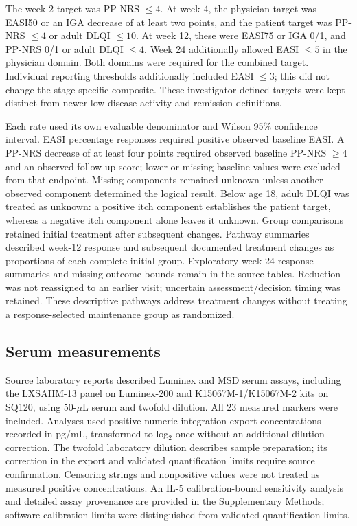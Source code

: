 The week-2 target was PP-NRS $\leq4$. At week 4, the physician target was EASI50 or an IGA decrease of at least two points, and the patient target was PP-NRS $\leq4$ or adult DLQI $\leq10$. At week 12, these were EASI75 or IGA 0/1, and PP-NRS 0/1 or adult DLQI $\leq4$. Week 24 additionally allowed EASI $\leq5$ in the physician domain. Both domains were required for the combined target. Individual reporting thresholds additionally included EASI $\leq3$; this did not change the stage-specific composite. These investigator-defined targets were kept distinct from newer low-disease-activity and remission definitions.\citep{merola2026iec}

Each rate used its own evaluable denominator and Wilson 95\% confidence interval. EASI percentage responses required positive observed baseline EASI. A PP-NRS decrease of at least four points required observed baseline PP-NRS $\geq4$ and an observed follow-up score; lower or missing baseline values were excluded from that endpoint. Missing components remained unknown unless another observed component determined the logical result. Below age 18, adult DLQI was treated as unknown: a positive itch component establishes the patient target, whereas a negative itch component alone leaves it unknown. Group comparisons retained initial treatment after subsequent changes. Pathway summaries described week-12 response and subsequent documented treatment changes as proportions of each complete initial group. Exploratory week-24 response summaries and missing-outcome bounds remain in the source tables. Reduction was not reassigned to an earlier visit; uncertain assessment/decision timing was retained. These descriptive pathways address treatment changes without treating a response-selected maintenance group as randomized.\citep{iche9r1}

\subsection{Serum measurements}
Source laboratory reports described Luminex and MSD serum assays, including the LXSAHM-13 panel on Luminex-200 and K15067M-1/K15067M-2 kits on SQ120, using 50-$\mu$L serum and twofold dilution. All 23 measured markers were included. Analyses used positive numeric integration-export concentrations recorded in pg/mL, transformed to log$_2$ once without an additional dilution correction. The twofold laboratory dilution describes sample preparation; its correction in the export and validated quantification limits require source confirmation. Censoring strings and nonpositive values were not treated as measured positive concentrations. An IL-5 calibration-bound sensitivity analysis and detailed assay provenance are provided in the Supplementary Methods; software calibration limits were distinguished from validated quantification limits.


